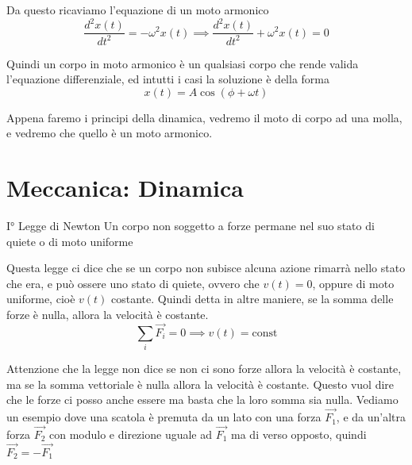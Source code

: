 \documentclass{rapport}
\begin{document}
Da questo ricaviamo l'equazione di un moto armonico
\[
\dfrac{d^2x(t)}{dt^2} = -\omega^2 x(t) \implies \dfrac{d^2x(t)}{dt^2} +\omega^2 x(t) = 0
\]

Quindi un corpo in moto armonico è un qualsiasi corpo che rende valida l'equazione differenziale, ed intutti i casi  la soluzione è della forma 
\[
x(t) = A\cos(\phi + \omega t)
\]

Appena faremo i principi della dinamica, vedremo il moto di corpo ad una molla, e vedremo che quello è un moto armonico.

\section{Meccanica: Dinamica}

\begin{legge}{I° Legge di Newton}{}
  Un corpo non soggetto a forze permane nel suo stato di quiete o di moto uniforme
\end{legge}

Questa legge ci dice che se un corpo non subisce alcuna azione rimarrà nello stato che era, e può ossere uno stato di quiete, ovvero che $v(t) = 0$, oppure di moto uniforme, cioè $v(t)$ costante. Quindi detta in altre maniere, se la somma delle forze è nulla, allora la velocità è costante. 
\[
\sum_{i} \vec{F_i} = 0 \implies v(t) = \text{const}
\]

Attenzione che la legge non dice se non ci sono forze allora la velocità è costante, ma se la somma vettoriale è nulla allora la velocità è costante. Questo vuol dire che le forze ci posso anche essere ma basta che la loro somma sia nulla. Vediamo un esempio dove una scatola è premuta da un lato con una forza $\vec{F_1}$, e da un'altra forza $\vec{F_2}$ con modulo e direzione uguale ad $\vec{F_1}$ ma di verso opposto, quindi $\vec{F_2}= -\vec{F_1}$  


\begin{center}
\end{center}
\end{document}
